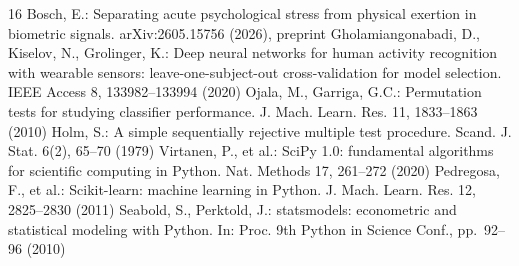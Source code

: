 \documentclass[runningheads]{llncs}
\begin{document}
\begin{thebibliography}{16}
 Bosch, E.: Separating acute psychological stress from physical exertion in biometric signals. arXiv:2605.15756 (2026), preprint
 Gholamiangonabadi, D., Kiselov, N., Grolinger, K.: Deep neural networks for human activity recognition with wearable sensors: leave-one-subject-out cross-validation for model selection. IEEE Access 8, 133982--133994 (2020)
 Ojala, M., Garriga, G.C.: Permutation tests for studying classifier performance. J. Mach. Learn. Res. 11, 1833--1863 (2010)
 Holm, S.: A simple sequentially rejective multiple test procedure. Scand. J. Stat. 6(2), 65--70 (1979)
 Virtanen, P., et al.: SciPy 1.0: fundamental algorithms for scientific computing in Python. Nat. Methods 17, 261--272 (2020)
 Pedregosa, F., et al.: Scikit-learn: machine learning in Python. J. Mach. Learn. Res. 12, 2825--2830 (2011)
 Seabold, S., Perktold, J.: statsmodels: econometric and statistical modeling with Python. In: Proc. 9th Python in Science Conf., pp.~92--96 (2010)
\end{thebibliography}
\end{document}
